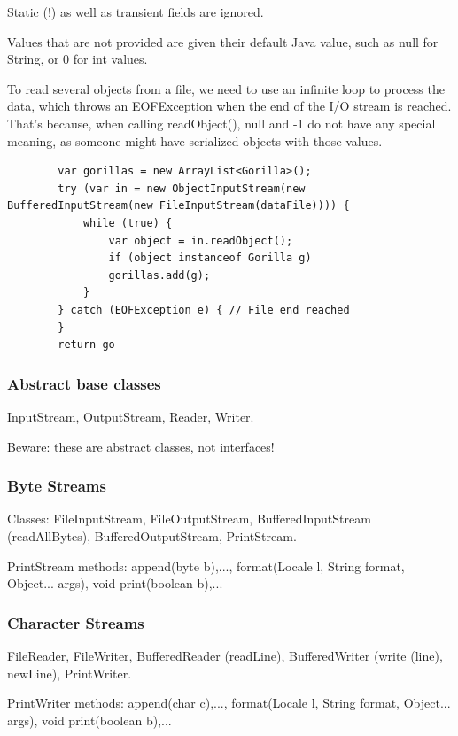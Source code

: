 \documentclass{scrartcl}
\begin{document}
    Static (!) as well as transient fields are ignored.

    Values that are not provided are  given their default Java value, such as null for String, or 0 for int values.

    To read several objects from a file, we need to use an infinite loop to process the data,
    which throws an EOFException when the end of the I/O stream is reached. That's because, when calling readObject(), null and -­1 do not have any special meaning,
    as someone might have serialized objects with those values.

    \begin{lstlisting}
        var gorillas = new ArrayList<Gorilla>();
        try (var in = new ObjectInputStream(new BufferedInputStream(new FileInputStream(dataFile)))) {
            while (true) {
                var object = in.readObject();
                if (object instanceof Gorilla g)
                gorillas.add(g);
            }
        } catch (EOFException e) { // File end reached
        }
        return go
    \end{lstlisting}

\subsubsection{Abstract base classes}

    InputStream, OutputStream, Reader, Writer.

    Beware: these are abstract classes, not interfaces!

\subsubsection{Byte Streams}

    Classes: FileInputStream, FileOutputStream, BufferedInputStream (readAllBytes), BufferedOutputStream, PrintStream.

    PrintStream methods: append(byte b),..., format(Locale l, String format, Object... args), void print(boolean b),...

\subsubsection{Character Streams}

    FileReader, FileWriter, BufferedReader (readLine), BufferedWriter (write (line), newLine), PrintWriter.

    PrintWriter methods: append(char c),..., format(Locale l, String format, Object... args), void print(boolean b),...
\end{document}

